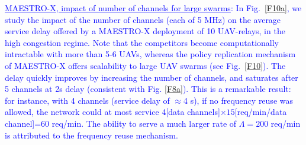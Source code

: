 \documentclass[12pt, draftcls, onecolumn]{IEEEtran}
\theoremstyle{plain}
\theoremstyle{definition}
\theoremstyle{remark}
\newcommand\hlt[1]{\textcolor{blue}{#1}}
\begin{document}
\noindent
\hlt{{\underline{MAESTRO-X, impact of number of channels for large swarms}}:  In Fig.~\ref{F10a}, we study the impact of the number of channels (each of 5 MHz) on the average service delay offered by a MAESTRO-X deployment of 10 UAV-relays, in the high congestion regime.
Note that the competitors become computationally intractable with more than 5-6 UAVs,
whereas the policy replication mechanism of MAESTRO-X offers scalability to large UAV swarms
(see Fig.~\ref{F10}). The delay quickly improves by increasing the number of channels, and saturates after 5 channels at 2s delay (consistent with Fig. \ref{F8a}). This is a remarkable result: for instance, with 4 channels (service delay of $\approx$4 s), if no frequency reuse was allowed, the network could at most service 4[data channels]$\times 15$[req/min/data channel]=60 req/min. The ability to serve a much larger rate of $\Lambda=200$ req/min is attributed to the frequency reuse mechanism.}
\end{document}
